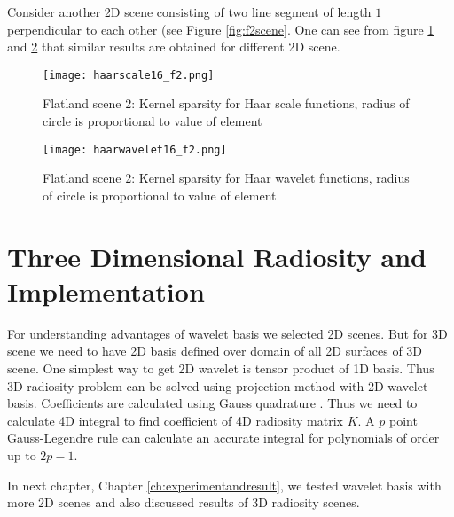 Consider another 2D scene consisting of two line segment of length $1$ perpendicular to each other (see Figure \ref{fig:f2scene}. One can see from figure \ref{fig:haarscalesparsef2} and \ref{fig:haarwaveletsparsef2} that similar results are obtained for different 2D scene.

\begin{figure}[tbh]
\centering{}
\captionsetup{justification=centering}
\texttt{[image: haarscale16\_f2.png]}
\caption{\label{fig:haarscalesparsef2}Flatland scene 2: Kernel sparsity for Haar scale functions, radius of circle is proportional to value of element}
\end{figure}
\begin{figure}[tbh]
\centering{}
\captionsetup{justification=centering}
\texttt{[image: haarwavelet16\_f2.png]}
\caption{\label{fig:haarwaveletsparsef2}Flatland scene 2: Kernel sparsity for Haar wavelet functions, radius of circle is proportional to value of element}
\end{figure}

\section{Three Dimensional Radiosity and Implementation}
For understanding advantages of wavelet basis we selected 2D scenes. But for 3D scene we need to have 2D basis defined over domain of all 2D surfaces of 3D scene. One simplest way to get 2D wavelet is tensor product of 1D basis. Thus 3D radiosity problem can be solved using projection method with 2D wavelet basis. Coefficients are calculated using Gauss quadrature \cite{book:stoer}. Thus we need to calculate 4D integral to find coefficient of 4D radiosity matrix $K$. A $p$ point  Gauss-Legendre rule can calculate an accurate integral for polynomials of order up to  $2p-1$.

In next chapter, Chapter \ref{ch:experimentandresult}, we tested wavelet basis with more 2D scenes and also discussed results of 3D radiosity scenes.






